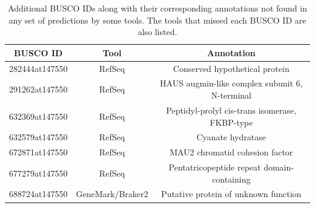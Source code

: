 \begin{table}[h]
  \centering
  \begin{tabular}{|c|c|c|}
    \hline
    BUSCO ID & Tool & Annotation \\ \hline
    282444at147550 & RefSeq & Conserved hypothetical protein \\ \hline
    291262at147550 & RefSeq & HAUS augmin-like complex subunit 6, N-terminal \\ \hline
    632369at147550 & RefSeq & Peptidyl-prolyl cis-trans isomerase, FKBP-type \\ \hline
    632579at147550 & RefSeq & Cyanate hydratase \\ \hline
    672871at147550 & RefSeq & MAU2 chromatid cohesion factor \\ \hline
    677279at147550 & RefSeq & Pentatricopeptide repeat domain-containing \\ \hline
    688724at147550 & GeneMark/Braker2 & Putative protein of unknown function \\ \hline
  \end{tabular}
  \caption[Additional missing BUSCO IDs]{Additional BUSCO IDs along with their corresponding annotations not found in any set of predictions by some tools. The tools that missed each BUSCO ID are also listed.}
  \label{table:missed-all-gf}
\end{table}

